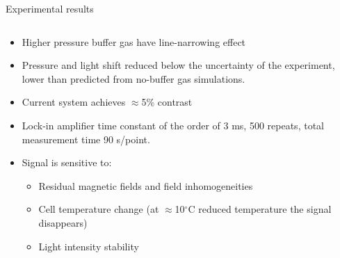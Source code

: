 \begin{block}{Experimental results}
\begin{columns}
\begin{column}{.49\textwidth}
\begin{center}
      \end{center}
    \end{column}
    \end{columns}
    \begin{itemize}
    \item Higher pressure buffer gas have line-narrowing effect
    \item Pressure and light shift reduced below the uncertainty of the experiment, lower than predicted from no-buffer gas simulations.
    \item Current system achieves $\approx$5\% contrast
    \item Lock-in amplifier time constant of the order of 3 ms, 500 repeats, total measurement time 90 s/point.
    \item Signal is sensitive to:
      \begin{itemize}
        \item Residual magnetic fields and field inhomogeneities
        \item Cell temperature change (at $\approx$10$^\circ$C reduced temperature the signal disappears)
        \item Light intensity stability
        \end{itemize}
    \end{itemize}
\end{block}
